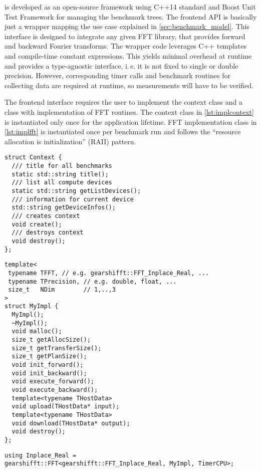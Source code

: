 

\gearshifft{} is developed as an open-source framework using C++14 standard and Boost Unit Test Framework for managing the benchmark trees.
The frontend API is basically just a wrapper mapping the use case explained in \cref{sec:benchmark_model}.
This interface is designed to integrate any given FFT library, that provides forward and backward Fourier transforms.
The wrapper code leverages C++ templates and compile-time constant expressions.
This yields minimal overhead at runtime and provides a type-agnostic interface, i.\,e. it is not fixed to single or double precision.
However, corresponding timer calls and benchmark routines for collecting data are required at runtime, so measurements will have to be verified.

The frontend interface requires the user to implement the context class and a class with implementation of FFT routines.
The context class in \cref{lst:implcontext} is instantiated only once for the application lifetime.
FFT implementation class in \cref{lst:implfft} is instantiated once per benchmark run and follows the ``resource allocation is initialization'' (RAII) pattern.


\begin{lstlisting}[caption={Context class required by gearshifft API},label={lst:implcontext}]
struct Context {
  /// title for all benchmarks
  static std::string title();
  /// list all compute devices
  static std::string getListDevices();
  /// information for current device
  std::string getDeviceInfos();
  /// creates context
  void create();
  /// destroys context
  void destroy();
};
\end{lstlisting}
\begin{lstlisting}[caption={FFT class required by gearshifft API},label={lst:implfft}]
template<
 typename TFFT, // e.g. gearshifft::FFT_Inplace_Real, ...
 typename TPrecision, // e.g. double, float, ...
 size_t   NDim        // 1,..,3
>
struct MyImpl {
  MyImpl();
  ~MyImpl();
  void malloc();
  size_t getAllocSize();
  size_t getTransferSize();
  size_t getPlanSize();
  void init_forward();
  void init_backward();
  void execute_forward();
  void execute_backward();
  template<typename THostData>
  void upload(THostData* input);
  template<typename THostData>
  void download(THostData* output);
  void destroy();
};
\end{lstlisting}
\begin{lstlisting}[caption={Using FFT class},label={lst:implfftusing}]
using Inplace_Real =
gearshifft::FFT<gearshifft::FFT_Inplace_Real, MyImpl, TimerCPU>;
\end{lstlisting}

